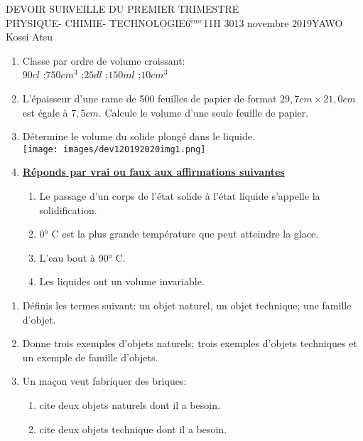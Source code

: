 \documentclass[12pt,a4paper]{book}
\newcommand{\prof}{YAWO Kossi Atsu}
\newcommand{\matiere}{\\PHYSIQUE- CHIMIE- TECHNOLOGIE}
\newcommand{\classe}{6$^{ème}$}
\begin{document}
\begin{devoir}{DEVOIR SURVEILLE DU PREMIER TRIMESTRE}{\matiere}{\classe}{1}{1H 30}{13 novembre 2019}{\prof}
\begin{exo}[7]
\begin{multicols}{2}
\begin{enumerate}
\item Classe par ordre de volume croissant:\\
$90cl$ \qquad ;\qquad $750 cm^3$ \qquad ;\qquad $25dl$ \qquad ;\qquad $150ml$ \qquad ;\qquad $10cm^3$ 
\item L'épaisseur d'une rame de 500 feuilles de papier de format $29,7 cm\times 21,0cm$ est égale à $7,5cm$. Calcule le volume d'une seule feuille de papier.
\item Détermine le volume du solide plongé dans le liquide.\\
\texttt{[image: images/dev120192020img1.png]}
\item \underline{\textbf{Réponds par vrai ou faux aux affirmations suivantes}} 
\begin{enumerate}
\item Le passage d'un corps de l'état solide à l'état liquide s'appelle la solidification.
\item 0° C est la plus grande température que peut atteindre la glace.
\item L'eau bout à 90° C.
\item Les liquides ont un volume invariable.
\end{enumerate}

\end{enumerate}
\end{multicols}
\end{exo}

\vspace{0.5cm}
\begin{exo}[5]
\begin{enumerate}
\item Définis les termes suivant: un objet naturel, un objet technique; une famille d'objet.
\item Donne trois exemples d'objets naturels; trois exemples d'objets techniques et un exemple de famille d'objets.
\item Un maçon veut fabriquer des briques:
\begin{enumerate}
\item cite deux objets naturels dont il a besoin.
\item cite deux objets technique dont il a besoin.
\end{enumerate}
\end{enumerate}
\end{exo}

\tableofcompetences
\end{devoir}
\end{document}
